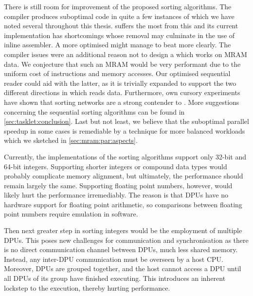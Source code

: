 There is still room for improvement of the proposed sorting algorithms.
The compiler produces suboptimal code in quite a few instances of which we have noted several throughout this thesis.
\QS{} suffers the most from this and its current implementation has shortcomings whose removal may culminate in the use of inline assembler.
A more optimised \QS{} might manage to beat \MS{} more clearly.
The compiler issues were an additional reason not to design a \QS{} which works on \ac{MRAM} data.
We conjecture that such an \ac{MRAM} \QS{} would be very performant due to the uniform cost of instructions and memory accesses.
Our optimised sequential reader could aid with the latter, as it is trivially expanded to support the two different directions in which \QS{} reads data.
Furthermore, own cursory experiments have shown that sorting networks are a strong contender to \IS{}.
More suggestions concerning the sequential sorting algorithms can be found in \cref{sec:tasklet:conclusion}.
Last but not least, we believe that the suboptimal parallel speedup in some cases is remediable by a technique for more balanced workloads which we sketched in \cref{sec:mram:par:aspects}.

Currently, the implementations of the sorting algorithms support only 32-bit and 64-bit integers.
Supporting shorter integers or compound data types would probably complicate memory alignment, but ultimately, the performance should remain largely the same.
Supporting floating point numbers, however, would likely hurt the performance irremediably.
The reason is that \acp{DPU} have no hardware support for floating point arithmetic, so comparisons between floating point numbers require emulation in software.

Then next greater step in sorting integers would be the employment of multiple \acp{DPU}.
This poses new challenges for communication and synchronisation as there is no direct communication channel between \acp{DPU}, much less shared memory.
Instead, any inter-\acs{DPU} communication must be overseen by a host \ac{CPU}.
Moreover, \acp{DPU} are grouped together, and the host cannot access a \ac{DPU} until all \acp{DPU} of its group have finished executing.
This introduces an inherent lockstep to the execution, thereby hurting performance.
